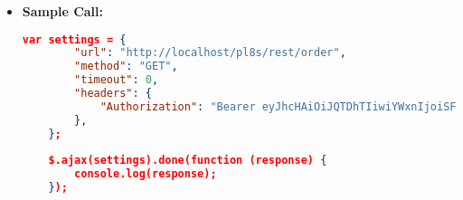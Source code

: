 \begin{itemize}
\begin{itemize}
\begin{lstlisting}[language=json]
	{
		"message": {
			"message": "Cannot authenticate the user.",
			"error-code": "EF00",
			"error-details": "No authorization header sent."
		}
	}
			\end{lstlisting}
		\end{itemize}	
    \item \textbf{Sample Call:}
		\begin{lstlisting}[language=json]		
	var settings = {
		"url": "http://localhost/pl8s/rest/order",
		"method": "GET",
		"timeout": 0,
		"headers": {
			"Authorization": "Bearer eyJhcHAiOiJQTDhTIiwiYWxnIjoiSFM1MTIifQ.eyJ1aWQiOjMsInJvbCI6ImN 1c3RvbWVyIiwic3RyIjoiY3VzX1B3OHJKbmd5eldOcmZ5IiwiZGF0IjoxNzE0M zQyNjAxNjMwfQ.RrH8ojpudntUVEZVnbvVw1GpUEU56tdnhnCSrnCqoHgUAwMM xXJDcTMfKazQmrIZ_OSfges7-lECny6p-t5ITA"
		},
	};
	
	$.ajax(settings).done(function (response) {
		console.log(response);
	});
	\end{lstlisting}
  \end{itemize}		
